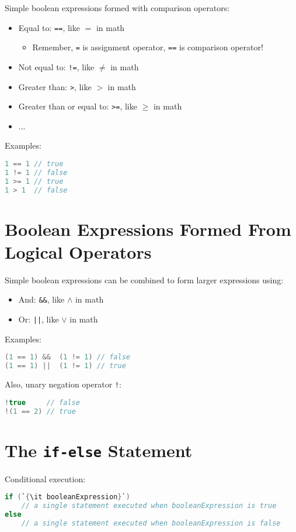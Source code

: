 \documentclass{article}
\begin{document}
Simple boolean expressions formed with comparison operators:
\begin{itemize}
\item Equal to: {\tt ==}, like $=$ in math
  \begin{itemize}
    \item Remember, {\tt =} is assignment operator, {\tt ==} is comparison operator!
  \end{itemize}
\item Not equal to: {\tt !=}, like $\ne$ in math
\item Greater than: {\tt >}, like $>$ in math
\item Greater than or equal to: {\tt >=}, like $\ge$ in math
\item ...
\end{itemize}
Examples:
\begin{lstlisting}[language=Java]
1 == 1 // true
1 != 1 // false
1 >= 1 // true
1 > 1  // false
\end{lstlisting}


\section{Boolean Expressions Formed From Logical Operators}


Simple boolean expressions can be combined to form larger expressions using:
\begin{itemize}
\item And: {\tt \&\&}, like $\land$ in math
\item Or: {\tt ||}, like $\lor$ in math
\end{itemize}
Examples:
\begin{lstlisting}[language=Java]
(1 == 1) &&  (1 != 1) // false
(1 == 1) ||  (1 != 1) // true
\end{lstlisting}

Also, unary negation operator {\tt !}:

\begin{lstlisting}[language=Java]
!true     // false
!(1 == 2) // true
\end{lstlisting}



\section{The {\tt if-else} Statement}


Conditional execution:
\begin{lstlisting}[language=Java,escapechar=`]
if (`{\it booleanExpression}`)
    // a single statement executed when booleanExpression is true
else
    // a single statement executed when booleanExpression is false
\end{lstlisting}
\end{document}
